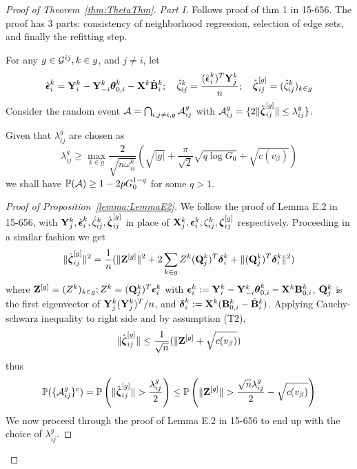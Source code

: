 \documentclass[fleqn,11pt]{article}
\numberwithin{equation}{section}
\begin{document}
\begin{proof}[Proof of Theorem~\ref{thm:ThetaThm}]


\textit{Part I.} Follows proof of thm 1 in 15-656. The proof has 3 parts: consistency of neighborhood regression, selection of edge sets, and finally the refitting step.

For any $g \in {\cal{G}}^{ij}, k \in g$, and $j \neq i$, let
%
$$
\hat {{\boldsymbol{\epsilon}}}_i^k = {\mathbf{Y}}_i^k - {\mathbf{Y}}_{-i}^k {\boldsymbol{\theta}}_{0,i}^k - {\mathbf{X}}^k \hat {{\mathbf{B}}}_i^k; \quad
\hat \zeta_{ij}^k = \frac{(\hat {{\boldsymbol{\epsilon}}}_i^k)^T {\mathbf{Y}}_j^k}{n}; \quad
\hat {{\boldsymbol{\zeta}}}_{ij}^{[g]} = (\hat \zeta_{ij}^k)_{k \in g}
$$
%
Consider the random event ${\cal{A}} = \bigcap_{i, j\neq i, g} {\cal{A}}_{ij}^g$ with ${\cal{A}}_{ij}^g = \{ 2 \| \hat {{\boldsymbol{\zeta}}}_{ij}^{[g]} \| \leq \lambda_{ij}^g \}$.

\begin{Proposition}\label{lemma:LemmaE2}
Given that $\lambda_{ij}^g$ are chosen as
%
$$
\lambda_{ij}^g \geq \max_{k \in g} \frac{2}{\sqrt{n \omega_{ii}^k}} \left( \sqrt{|g|} + \frac{\pi}{\sqrt 2} \sqrt {q \log G_0}  + \sqrt {c (v_\beta)} \right)
$$
%
we shall have $ {\mathbb{P}} ({\cal{A}}) \geq 1 - 2p G_0^{1-q} $ for some $q>1$.
\end{Proposition}

\begin{proof}[Proof of Proposition~\ref{lemma:LemmaE2}]
We follow the proof of Lemma E.2 in 15-656, with ${\mathbf{Y}}_j^k, \hat {{\boldsymbol{\epsilon}}}_i^k, \hat \zeta_{ij}^k, \hat {{\boldsymbol{\zeta}}}_{ij}^{[g]}$ in place of ${\mathbf{X}}_j^k, {\boldsymbol{\epsilon}}_i^k, \zeta_{ij}^k, {\boldsymbol{\zeta}}_{ij}^{[g]}$ respectively. Proceeding in a similar fashion we get
%
$$
\| \hat {{\boldsymbol{\zeta}}}_{ij}^{[g]} \|^2 = \frac{1}{n} ( \| {\mathbf{Z}}^{[g]} \|^2 + 2 \sum_{k \in g} Z^k ({\mathbf{Q}}_j^k)^T {\boldsymbol{\delta}}_i^k + \| ({\mathbf{Q}}_j^k)^T {\boldsymbol{\delta}}_i^k  \|^2)
$$
%
where ${\mathbf{Z}}^{[g]} = (Z^k)_{k \in g}; Z^k = ({\mathbf{Q}}_j^k)^T {\boldsymbol{\epsilon}}_i^k$ with ${\boldsymbol{\epsilon}}_i^k := {\mathbf{Y}}_i^k - {\mathbf{Y}}_{-i}^k {\boldsymbol{\theta}}_{0,i}^k - {\mathbf{X}}^k {\mathbf{B}}_{0,i}^k$, ${\mathbf{Q}}_j^k$ is the first eigenvector of ${\mathbf{Y}}_j^k ({\mathbf{Y}}_j^k)^T/n$, and ${\boldsymbol{\delta}}_i^k := {\mathbf{X}}^k ({\mathbf{B}}_{0,i}^k - \hat {{\mathbf{B}}}_i^k)$. Applying Cauchy-schwarz inequality to right side and by assumption (T2),
%
$$
\| \hat {{\boldsymbol{\zeta}}}_{ij}^{[g]} \| \leq \frac{1}{\sqrt n} ( \| {\mathbf{Z}}^{[g]} + \sqrt{ c(v_\beta)})
$$
%
thus
$$
{\mathbb{P}} ( \{ {\cal{A}}_{ij}^g \}^c ) = {\mathbb{P}} \left( \| \hat {{\boldsymbol{\zeta}}}_{ij}^{[g]} \| > \frac{\lambda_{ij}^g}{2} \right) \leq {\mathbb{P}} \left( \| {\mathbf{Z}}^{[g]} \|  > \frac{\sqrt n \lambda_{ij}^g}{2} - \sqrt{c(v_\beta)}  \right)
$$
We now proceed through the proof of Lemma E.2 in 15-656 to end up with the choice of $\lambda_{ij}^g$.
\end{proof}
%


\end{proof}
\end{document}
